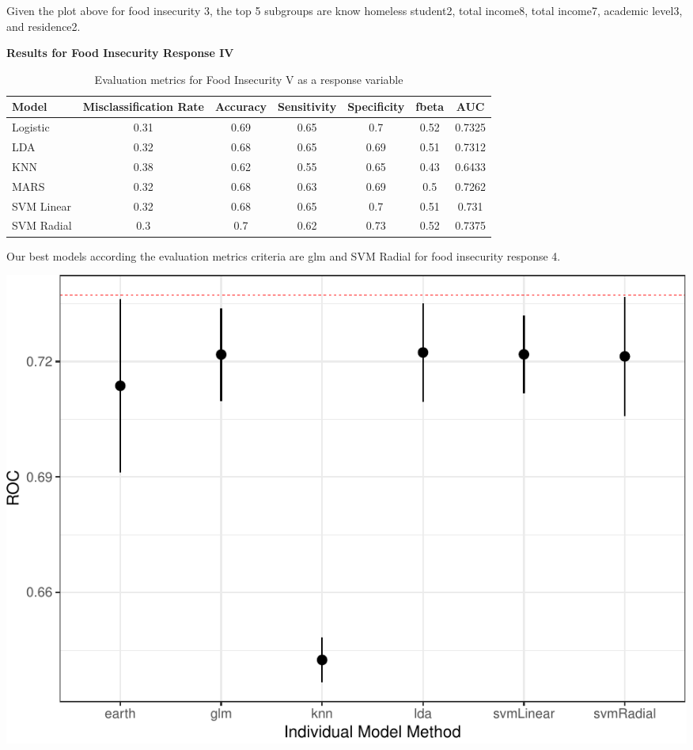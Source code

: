 \documentclass[
  10pt,
]{article}
\begin{document}
Given the plot above for food insecurity 3, the top 5 subgroups are know homeless student2, total income8, total income7, academic level3, and residence2.

\textbf{Results for Food Insecurity Response IV}

\begin{table}[H]

\caption{\label{tab:unnamed-chunk-29}Evaluation metrics for Food Insecurity V  as a response variable}
\centering
\fontsize{12}{14}\selectfont
\begin{tabular}[t]{lcccccc}
\toprule
Model & Misclassification Rate & Accuracy & Sensitivity & Specificity & fbeta & AUC\\
\midrule
Logistic & 0.31 & 0.69 & 0.65 & 0.7 & 0.52 & 0.7325\\
LDA & 0.32 & 0.68 & 0.65 & 0.69 & 0.51 & 0.7312\\
KNN & 0.38 & 0.62 & 0.55 & 0.65 & 0.43 & 0.6433\\
MARS & 0.32 & 0.68 & 0.63 & 0.69 & 0.5 & 0.7262\\
SVM Linear & 0.32 & 0.68 & 0.65 & 0.7 & 0.51 & 0.731\\
SVM Radial & 0.3 & 0.7 & 0.62 & 0.73 & 0.52 & 0.7375\\
\bottomrule
\end{tabular}
\end{table}

Our best models according the evaluation metrics criteria are glm and SVM Radial for food insecurity response 4.\\

\begin{center}\includegraphics{final_phase2_report_files/figure-latex/unnamed-chunk-30-1} \end{center}
\end{document}
